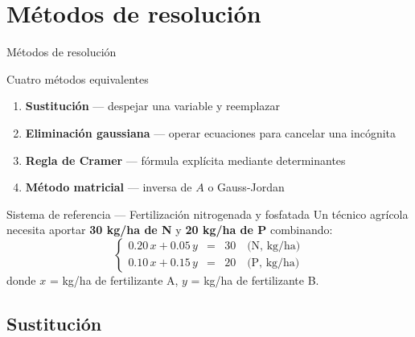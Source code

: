\documentclass[11pt, aspectratio=169]{beamer}
\begin{document}
\section{Métodos de resolución}

\begin{frame}{Métodos de resolución}
  \begin{block}{Cuatro métodos equivalentes}
    \begin{enumerate}
      \item \textbf{Sustitución} — despejar una variable y reemplazar
      \item \textbf{Eliminación gaussiana} — operar ecuaciones para cancelar una incógnita
      \item \textbf{Regla de Cramer} — fórmula explícita mediante determinantes
      \item \textbf{Método matricial} — inversa de $A$ o Gauss-Jordan
    \end{enumerate}
  \end{block}

  \vspace{0.5em}
  \begin{exampleblock}{Sistema de referencia — Fertilización nitrogenada y fosfatada}
    Un técnico agrícola necesita aportar \textbf{30 kg/ha de N} y \textbf{20 kg/ha de P}
    combinando:
    \[
      \left\{
      \begin{array}{lcl}
        0.20\,x + 0.05\,y & = & 30 \quad \text{(N, kg/ha)} \\[4pt]
        0.10\,x + 0.15\,y & = & 20 \quad \text{(P, kg/ha)}
      \end{array}
      \right.
    \]
    donde $x$ = kg/ha de fertilizante A, \; $y$ = kg/ha de fertilizante B.
  \end{exampleblock}
\end{frame}

\subsection{Sustitución}
\end{document}

